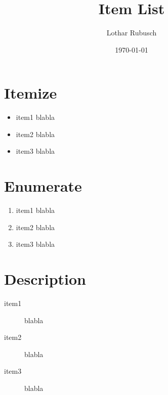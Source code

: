 \documentclass[a4paper,10pt]{scrartcl}
\title{Item List}
\author{Lothar Rubusch}
\date{\today}
\begin{document}
\sffamily

\maketitle

\parindent0mm

\section{Itemize}
\begin{itemize}
 \item item1 blabla
 \item item2 blabla
 \item item3 blabla
\end{itemize}


\section{Enumerate}
\begin{enumerate}
 \item item1 blabla
 \item item2 blabla
 \item item3 blabla
\end{enumerate}


\section{Description}
\begin{description}
 \item[item1] blabla
 \item[item2] blabla
 \item[item3] blabla
\end{description}
\end{document}

